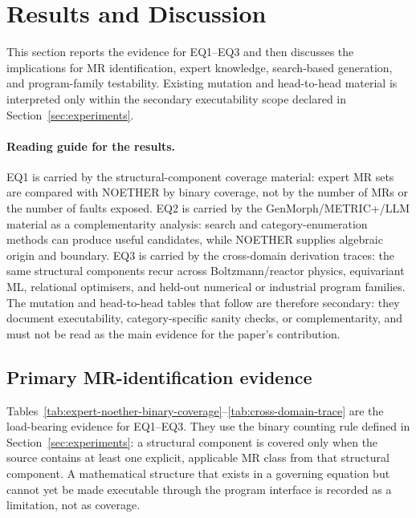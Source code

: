 \documentclass[acmsmall,screen,review]{acmart}
\begin{document}
\section{Results and Discussion}
\label{sec:results-discussion}

This section reports the evidence for EQ1--EQ3 and then discusses the implications for MR identification, expert knowledge, search-based generation, and program-family testability. Existing mutation and head-to-head material is interpreted only within the secondary executability scope declared in Section~\ref{sec:experiments}.

\paragraph{Reading guide for the results.}
EQ1 is carried by the structural-component coverage material: expert MR sets are compared with NOETHER by binary coverage, not by the number of MRs or the number of faults exposed. EQ2 is carried by the GenMorph/METRIC+/LLM material as a complementarity analysis: search and category-enumeration methods can produce useful candidates, while NOETHER supplies algebraic origin and boundary. EQ3 is carried by the cross-domain derivation traces: the same structural components recur across Boltzmann/reactor physics, equivariant ML, relational optimisers, and held-out numerical or industrial program families. The mutation and head-to-head tables that follow are therefore secondary: they document executability, category-specific sanity checks, or complementarity, and must not be read as the main evidence for the paper's contribution.

\subsection{Primary MR-identification evidence}
\label{subsec:primary-identification-evidence}

Tables~\ref{tab:expert-noether-binary-coverage}--\ref{tab:cross-domain-trace}
are the load-bearing evidence for EQ1--EQ3. They use the binary counting rule
defined in Section~\ref{sec:experiments}: a structural component is covered only when the source
contains at least one explicit, applicable MR class from that structural component. A
mathematical structure that exists in a governing equation but cannot yet be
made executable through the program interface is recorded as a limitation, not
as coverage.
\end{document}
